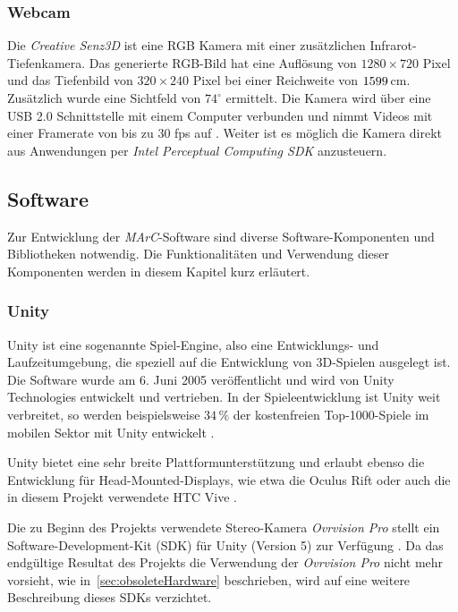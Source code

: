 \subsubsection{Webcam}\label{sec:webcam} 
Die \textit{Creative Senz3D} ist eine RGB Kamera mit einer zusätzlichen Infrarot-Tiefenkamera. Das generierte RGB-Bild hat eine Auflösung von $1280\times720$ Pixel und das Tiefenbild von $320\times240$ Pixel bei einer Reichweite von $15\-99\,$cm. Zusätzlich wurde eine Sichtfeld von $74^\circ$ ermittelt. Die Kamera wird über eine USB 2.0 Schnittstelle mit einem Computer verbunden und nimmt Videos mit einer Framerate von bis zu $30$ fps auf \cite{website:Senz3d}. Weiter ist es möglich die Kamera direkt aus Anwendungen per \textit{Intel Perceptual Computing SDK} anzusteuern.

\subsection{Software} 
Zur Entwicklung der \textit{MArC}-Software sind diverse Software-Komponenten und Bibliotheken notwendig. Die Funktionalitäten und Verwendung dieser Komponenten werden in diesem Kapitel kurz erläutert.


\subsubsection{Unity}\label{sec:unity}
Unity ist eine sogenannte Spiel-Engine, also eine Entwicklungs- und Laufzeitumgebung, die speziell auf die Entwicklung von 3D-Spielen ausgelegt ist. Die Software wurde am 6. Juni 2005 veröffentlicht \cite{haas2014history} und wird von Unity Technologies \cite{website:Unity} entwickelt und vertrieben. In der Spieleentwicklung ist Unity weit verbreitet, so werden beispielsweise $34\,\%$ der kostenfreien Top-1000-Spiele im mobilen Sektor mit Unity entwickelt \cite{website:UnityPR}.

Unity bietet eine sehr breite Plattformunterstützung \cite{website:UnityMultiPlatform} und erlaubt ebenso die Entwicklung für Head-Mounted-Displays, wie etwa die Oculus Rift \cite{website:UnityOculus}\cite{website:UnityVRoverview} oder auch die in diesem Projekt verwendete HTC Vive \cite{website:UnityVRoverview}.

Die zu Beginn des Projekts verwendete Stereo-Kamera \emph{Ovrvision Pro} stellt ein Software-Development-Kit (SDK) für Unity (Version 5) zur Verfügung \cite{website:ovrvisionSetup}. Da das endgültige Resultat des Projekts die Verwendung der \emph{Ovrvision Pro} nicht mehr vorsieht, wie in~\ref{sec:obsoleteHardware} beschrieben, wird auf eine weitere Beschreibung dieses SDKs verzichtet.

